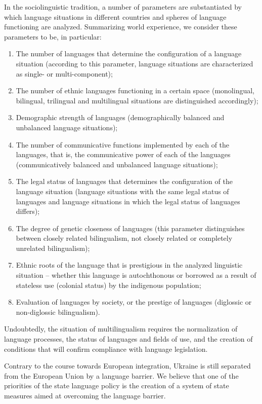 \documentclass[english]{textolivre}
\begin{document}
In the sociolinguistic tradition, a number of parameters are substantiated by which language situations in different countries and spheres of language functioning are analyzed. Summarizing world experience, we consider these parameters to be, in particular: 
\begin{enumerate}
 \item The number of languages that determine the configuration of a language situation (according to this parameter, language situations are characterized as single- or multi-component); 
 \item The number of ethnic languages functioning in a certain space (monolingual, bilingual, trilingual and multilingual situations are distinguished accordingly); 
 \item Demographic strength of languages (demographically balanced and unbalanced language situations);
 \item The number of communicative functions implemented by each of the languages, that is, the communicative power of each of the languages (communicatively balanced and unbalanced language situations);
 \item The legal status of languages that determines the configuration of the language situation (language situations with the same legal status of languages and language situations in which the legal status of languages differs);
 \item The degree of genetic closeness of languages (this parameter distinguishes between closely related bilingualism, not closely related or completely unrelated bilingualism);
 \item Ethnic roots of the language that is prestigious in the analyzed linguistic situation – whether this language is autochthonous or borrowed as a result of stateless use (colonial status) by the indigenous population;
 \item Evaluation of languages by society, or the prestige of languages (diglossic or non-diglossic bilingualism).
\end{enumerate}

Undoubtedly, the situation of multilingualism requires the normalization of language processes, the status of languages and fields of use, and the creation of conditions that will confirm compliance with language legislation.

Contrary to the course towards European integration, Ukraine is still separated from the European Union by a language barrier. We believe that one of the priorities of the state language policy is the creation of a system of state measures aimed at overcoming the language barrier.
\end{document}
